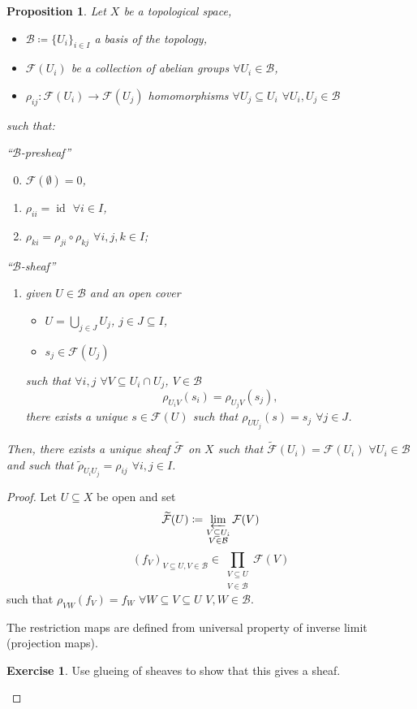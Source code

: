 \documentclass[12pt]{article}
\DeclareMathOperator{\id}{id}
\newtheorem*{proposition}{Proposition}
\theoremstyle{definition}
\newtheorem*{exercise}{Exercise}
\begin{document}
\begin{proposition}
Let $X$ be a topological space,
\begin{itemize}
\item $\mathcal{B}\coloneqq\{U_i\}_{i\in I}$ a basis of the topology,
\item $\mathcal{F}(U_i)$ be a collection of abelian groups $\forall U_i\in\mathcal{B}$,
\item $\rho_{ij}:\mathcal{F}(U_i)\rightarrow\mathcal{F}(U_j)$ homomorphisms $\forall U_j\subseteq U_i$ $\forall U_i,U_j\in\mathcal{B}$
\end{itemize}
such that:

``$\mathcal{B}$-presheaf''
\begin{enumerate}[label=\arabic*)]
\setcounter{enumi}{-1}
\item $\mathcal{F}(\emptyset)=0$,
\item $\rho_{ii}=\id$ $\forall i\in I$,
\item $\rho_{ki}=\rho_{ji}\circ\rho_{kj}$ $\forall i,j,k\in I$;
\end{enumerate}
``$\mathcal{B}$-sheaf''
\begin{enumerate}[label=\arabic*),resume]
\item given $U\in\mathcal{B}$ and an open cover
\begin{itemize}[label=$-$]
\item $U=\bigcup_{j\in J}U_j$, $j\in J\subseteq I$,
\item $s_j\in\mathcal{F}(U_j)$
\end{itemize}
such that $\forall i,j$ $\forall V\subseteq U_i\cap U_j$, $V\in\mathcal{B}$
\[\rho_{U_iV}(s_i)=\rho_{U_jV}(s_j),\]
there exists a unique $s\in\mathcal{F}(U)$ such that $\rho_{UU_j}(s)=s_j$ $\forall j\in J$.
\end{enumerate}

Then, there exists a unique sheaf $\widetilde{\mathcal{F}}$ on $X$ such that $\widetilde{\mathcal{F}}(U_i)=\mathcal{F}(U_i)$ $\forall U_i\in\mathcal{B}$ and such that $\widetilde{\rho}_{U_iU_j}=\rho_{ij}$ $\forall i,j\in I$.
\end{proposition}

\begin{proof}
Let $U\subseteq X$ be open and set
\[\widetilde{\mathcal{F}}(U)\coloneqq\varprojlim_{\substack{V\subseteq U_i\\V\in\mathcal{B}}}\mathcal{F}(V)\]
\[(f_V)_{V\subseteq U,V\in\mathcal{B}}\in\prod_{\substack{V\subseteq U\\V\in\mathcal{B}}}\mathcal{F}(V)\]
such that $\rho_{VW}(f_V)=f_W$ $\forall W\subseteq V\subseteq U$ $V,W\in\mathcal{B}$.

The restriction maps are defined from universal property of inverse limit (projection maps).

\begin{exercise}
Use glueing of sheaves to show that this gives a sheaf.
\end{exercise}
\end{proof}
\end{document}
